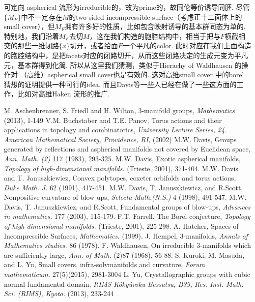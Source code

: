 \documentclass{article}
\theoremstyle{plain}%
\theoremstyle{definition}
\theoremstyle{remark}
\begin{document}
可定向 aspherical 流形为irreducible的，故为prime的，故同伦等价诱导同胚. 
尽管$\{M_F\}$中不一定存在$M$的two-sided incompressible surface（考虑正十二面体上的small cover），但$M_F$拥有许多好的性质，比如包含映射诱导的基本群同态为单的.
特别地，我们沿着$M_F$去切$M$，这在我们构造的胞腔结构中，相当于把与$F$横截相交的那些一维闭路$\{x\}$切开，或者给面$F$一个平凡的color. 此时对应在我们上面构造的胞腔结构中，是把facets对应的闭路切开，从而这些闭路决定的生成元变为平凡元，基本群得到化简. 所以从这里我们猜测，类似于Hierachy of Waldhausen 的操作对 （高维）aspherical small cover也是有效的.
 这对高维small cover 中的borel 猜想的证明提供一种可行的idea. 而且Davis等一些人已经在做了一些这方面的工作，比如对高维Haken 流形的推广.
\newpage
\begin{thebibliography}{99}
 M. Aschenbrenner, S. Friedl and H. Wilton, 3-manifold groups, {\em Mathematics} (2013), 1-149
 V.M. Buchstaber and T.E. Panov, Torus actions and their applications in topology and combinatorics, {\em University Lecture Series, 24. American Mathematical Society, Providence, RI,} (2002)
 M.W. Davis, Groups generated by reflections and aspherical manifolds not covered by Euclidean space, {\em Ann. Math. (2)} 117 (1983), 293-325.
 M.W. Davis, Exotic aspherical manifolds, {\em Topology of high-dimensional manifolds.}  (Trieste, 2001), 371-404.
 M.W. Davis and T. Januszkiewicz, Convex polytopes, coxeter orbifolds and torus actions, {\em Duke Math. J.} 62 (1991), 417-451.
 M.W. Davis, T. Januszkiewicz, and R.Scott, Nonpositive curvature of blow-ups, {\em Selecta Math.(N.S.)} 4 (1998), 491-547.
 M.W. Davis, T. Januszkiewicz, and R.Scott, Fundamental groups of blow-ups, {\em Advances in mathematics.} 177 (2003), 115-179.
 F.T. Farrell, The Borel conjecture, {\em Topology of high-dimensional manifolds.}  (Trieste, 2001), 225-298.
 A. Hatcher, Spaces of Incompressible Surfaces, {\em Mathematics.}  (1999).
 J. Hempel, 3-manifolds, {\em Annals of Mathematics studies.} 86 (1978).
 F. Waldhausen, On irreducible 3-manifolds which are sufficiently large, {\em Ann. of Math.}  (2)87 (1968), 56-88.
 S. Kuroki, M. Masuda, and L. Yu, Small covers, infra-solvmanifolds and curvature, {\em Forum mathematicum.} 27(5)(2015), 2981-3004
 L. Yu, Crystallographic groups with cubic normal fundamental domain, {\em RIMS Kôkyûroku Bessatsu, B39, Res. Inst. Math. Sci. (RIMS), Kyoto.} (2013), 233-244
\end{thebibliography}
\end{document}
